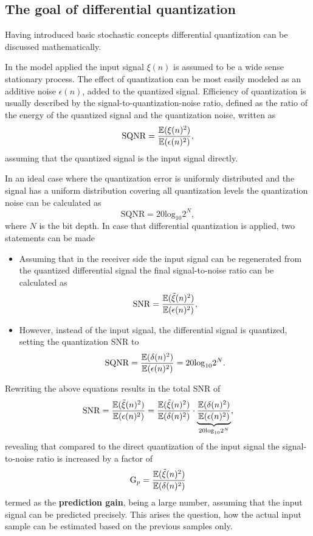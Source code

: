 \subsection{The goal of differential quantization}

Having introduced basic stochastic concepts differential quantization can be discussed mathematically.

In the model applied the input signal $\xi(n)$ is assumed to be a wide sense stationary process.
The effect of quantization can be most easily modeled as an additive noise $\epsilon(n)$, added to the quantized signal.
Efficiency of quantization is usually described by the signal-to-quantization-noise ratio, defined as the ratio of the energy of the quantized signal and the quantization noise, written as
\begin{equation}
\mathrm{SQNR} = \frac{\operatorname{\mathbb{E}}(\xi(n)^2)}{\operatorname{\mathbb{E}}(\epsilon(n)^2)},
\end{equation}
assuming that the quantized signal is the input signal directly.

In an ideal case where the quantization error is uniformly distributed and the signal has a uniform distribution covering all quantization levels the quantization noise can be calculated as
\begin{equation}
\mathrm{SQNR} = 20 \mathrm{log}_{10} 2^N,
\end{equation}
where $N$ is the bit depth.
In case that differential quantization is applied, two statements can be made
\begin{itemize}
\item Assuming that in the receiver side the input signal can be regenerated from the quantized differential signal the final signal-to-noise ratio can be calculated as 
\begin{equation}
\mathrm{SNR} = \frac{\operatorname{\mathbb{E}}(\tilde{\xi}(n)^2)}{\operatorname{\mathbb{E}}(\epsilon(n)^2)},
\end{equation}
\item However, instead of the input signal, the differential signal is quantized, setting the quantization SNR to
\begin{equation}
\mathrm{SQNR} = \frac{\operatorname{\mathbb{E}}(\delta(n)^2)}{\operatorname{\mathbb{E}}(\epsilon(n)^2)} = 20 \mathrm{log}_{10} 2^N.
\end{equation}
\end{itemize}
Rewriting the above equations results in the total SNR of 
\begin{equation}
\mathrm{SNR} = \frac{\operatorname{\mathbb{E}}(\tilde{\xi}(n)^2)}{\operatorname{\mathbb{E}}(\epsilon(n)^2)} = \frac{\operatorname{\mathbb{E}}(\tilde{\xi}(n)^2)}{\operatorname{\mathbb{E}}(\delta(n)^2)} \cdot 
\underbrace{\frac{\operatorname{\mathbb{E}}(\delta(n)^2)}{\operatorname{\mathbb{E}}(\epsilon(n)^2)}}_{20 \mathrm{log}_{10} 2^N}
,
\end{equation}
revealing that compared to the direct quantization of the input signal the signal-to-noise ratio is increased by a factor of
\begin{equation}
\mathrm{G}_p = \frac{\operatorname{\mathbb{E}}(\tilde{\xi}(n)^2)}{\operatorname{\mathbb{E}}(\delta(n)^2)} 
\end{equation}
termed as the \textbf{prediction gain}, being a large number, assuming that the input signal can be predicted precisely.
This arises the question, how the actual input sample can be estimated based on the previous samples only.

